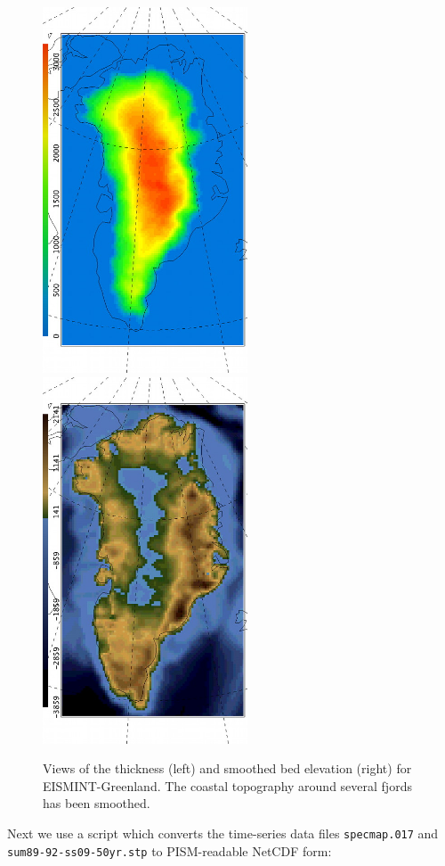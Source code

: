 \documentclass[11pt,final]{amsart}
\begin{document}
\begin{figure}[ht]
\includegraphics[width=2.4in,keepaspectratio=true]{EISgreen_thick}\quad\includegraphics[width=2.4in,keepaspectratio=true]{EISgreen_bed}
\caption{Views of the thickness (left) and smoothed bed elevation (right) for EISMINT-Greenland.  The coastal topography around several fjords has been smoothed.}
\label{fig:greendata}
\end{figure}

Next we use a script which converts the time-series data files \texttt{specmap.017} and \texttt{sum89-92-ss09-50yr.stp} to PISM-readable NetCDF form:
\end{document}
